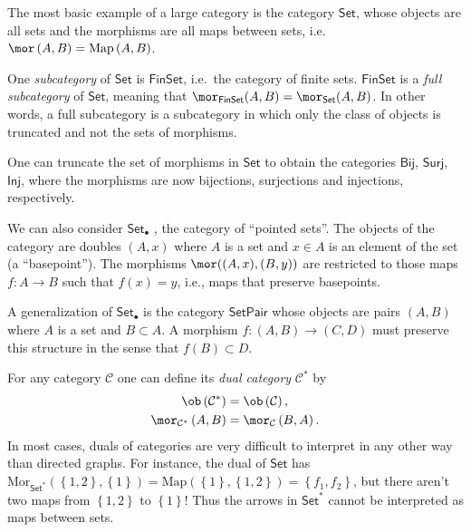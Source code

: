 \begin{example}
The most basic example of a large category is the category $\mathsf{Set}$,
whose objects are all sets and the morphisms are all maps between
sets, i.e.\ $\mor\left(A,B\right)=\mathrm{Map}\left(A,B\right)$. 

One \emph{subcategory} of $\mathsf{Set}$ is $\mathsf{FinSet}$,
i.e.\ the category of finite sets. $\mathsf{FinSet}$ is a \emph{full
subcategory} of $\mathsf{Set}$, meaning that $\mor_{\mathsf{FinSet}}(A,B)=\mor_{\mathsf{Set}}(A,B)$.
In other words, a full subcategory is a subcategory in which only
the class of objects is truncated and not the sets of morphisms.
\end{example}
%
\begin{example}
One can truncate the set of morphisms in $\mathsf{Set}$ to obtain
the categories $\mathsf{Bij}$, $\mathsf{Surj}$, $\mathsf{Inj}$,
where the morphisms are now bijections, surjections and injections,
respectively.
\end{example}
%
\begin{example}
We can also consider $\mathsf{Set}_{\bullet}$ , the category of ``pointed
sets''. The objects of the category are doubles $(A,x)$ where $A$
is a set and $x\in A$ is an element of the set (a ``basepoint'').
The morphisms $\mor((A,x),(B,y))$ are restricted to those maps $f:A\rightarrow B$
such that $f(x)=y$, i.e., maps that preserve basepoints.
\end{example}
%
\begin{example}
A generalization of $\mathsf{Set}_{\bullet}$ is the category $\mathsf{SetPair}$
whose objects are pairs $(A,B)$ where $A$ is a set and $B\subset A$.
A morphism $f:(A,B)\rightarrow(C,D)$ must preserve this structure
in the sense that $f(B)\subset D$.
\end{example}
%
\begin{example}
For any category $\mathcal{C}$ one can define its \emph{dual category}
$\mathcal{C}^{\ast}$ by
\begin{align}
\ob\left(\mathcal{C}^{\ast}\right) & =\ob\left(\mathcal{C}\right),\nonumber \\
\mor_{\mathcal{C}^{\ast}}\left(A,B\right) & =\mor_{\mathcal{C}}\left(B,A\right).
\end{align}
In most cases, duals of categories are very difficult to interpret
in any other way than directed graphs. For instance, the dual of $\mathsf{Set}$
has $\mathrm{Mor}_{\mathsf{Set}^{\ast}}\left(\left\{ 1,2\right\} ,\left\{ 1\right\} \right)=\mathrm{Map}\left(\left\{ 1\right\} ,\left\{ 1,2\right\} \right)=\left\{ f_{1},f_{2}\right\} $,
but there aren't two maps from $\left\{ 1,2\right\} $ to $\left\{ 1\right\} $!
Thus the arrows in $\mathsf{Set}^{\ast}$ cannot be interpreted as
maps between sets.
\end{example}

